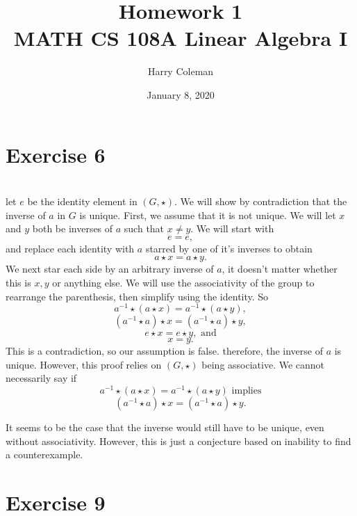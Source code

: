 \documentclass[12pt]{article}
\begin{document}
 
\title{Homework 1\\
    \large MATH CS 108A Linear Algebra I}
\author{Harry Coleman}
\date{January 8, 2020}

\maketitle

\section*{Exercise 6}
\\

let $e$ be the identity element in $(G, \star)$. We will show by contradiction that the inverse of $a$ in $G$ is unique. First, we assume that it is not unique. We will let $x$ and $y$ both be inverses of $a$ such that $x\ne y$. We will start with
\[e=e,\]
and replace each identity with $a$ starred by one of it's inverses to obtain
\[a\star x = a\star y.\]
We next star each side by an arbitrary inverse of $a$, it doesn't matter whether this is $x,y$ or anything else. We will use the associativity of the group to rearrange the parenthesis, then simplify using the identity. So
\[a^{-1}\star (a\star x) = a^{-1}\star (a\star y),\]
\[(a^{-1}\star a)\star x = (a^{-1}\star a)\star y,\]
\[e\star x = e\star y, \text{ and}\]
\[x = y.\]
This is a contradiction, so our assumption is false. therefore, the inverse of $a$ is unique. However, this proof relies on $(G, \star)$ being associative. We cannot necessarily say if
\[a^{-1}\star (a\star x) = a^{-1}\star (a\star y) \text{ implies}\]
\[(a^{-1}\star a)\star x = (a^{-1}\star a)\star y.\]

It seems to be the case that the inverse would still have to be unique, even without associativity. However, this is just a conjecture based on inability to find a counterexample.


\section*{Exercise 9}
\\
\end{document}
